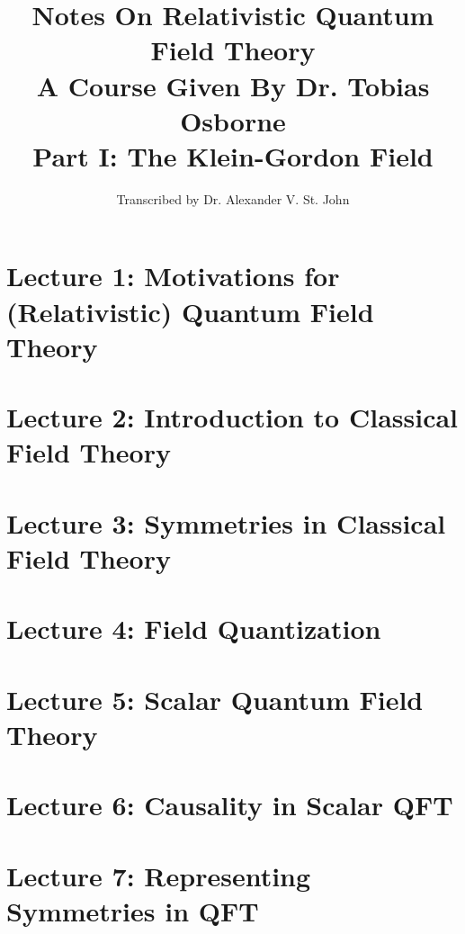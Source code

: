 \documentclass[10pt]{article}
\title{Notes On Relativistic Quantum Field Theory \\ A Course Given By Dr. Tobias Osborne \\ Part I: The Klein-Gordon Field}
\author{Transcribed by Dr. Alexander V. St. John}
\begin{document}
\maketitle

\clearpage

\section*{Lecture 1: Motivations for (Relativistic) Quantum Field Theory}
\label{sec: lec1}



\clearpage

\section*{Lecture 2: Introduction to Classical Field Theory}
\label{sec: lec2}



\clearpage

\section*{Lecture 3: Symmetries in Classical Field Theory}
\label{sec: lec3}



\clearpage

\section*{Lecture 4: Field Quantization}
\label{sec:lec4}



\clearpage

\section*{Lecture 5: Scalar Quantum Field Theory}
\label{sec:lec5}



\clearpage

\section*{Lecture 6: Causality in Scalar QFT}
\label{sec:lec6}



\clearpage

\section*{Lecture 7: Representing Symmetries in QFT}
\label{sec:lec7}
\end{document}
